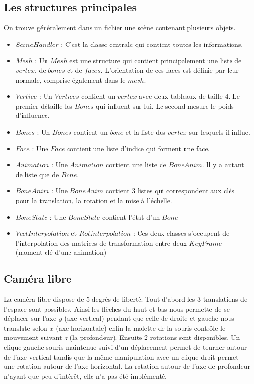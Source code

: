 \documentclass[a4paper]{report}
\begin{document}
\subsection{Les structures principales}
\par
On trouve généralement dans un fichier une scène contenant plusieurs objets.

\begin{itemize}
\item $SceneHandler$ : C'est la classe centrale qui contient toutes les informations.
\item $Mesh$ : Un $Mesh$ est une structure qui contient principalement une liste de $vertex$, de $bones$ et de $faces$. L'orientation de ces faces est définie par leur normale, comprise également dans le $mesh$.
\item $Vertice$ : Un $Vertices$ contient un $vertex$ avec deux tableaux de taille 4. Le premier détaille les $Bones$ qui influent sur lui. Le second mesure le poids d'influence.
\item $Bones$ : Un $Bones$ contient un $bone$ et la liste des $vertex$ sur lesquels il influe.
\item $Face$ : Une $Face$ contient une liste d'indice qui forment une face.
\item $Animation$ : Une $Animation$ contient une liste de $BoneAnim$. Il y a autant de liste que de $Bone$.
\item $BoneAnim$ : Une $BoneAnim$ contient 3 listes qui correspondent aux clés pour la translation, la rotation et la mise à l'échelle.
\item $BoneState$ : Une $BoneState$ contient l'état d'un $Bone$
\item $VectInterpolation$ et $RotInterpolation$ : Ces deux classes s'occupent de l'interpolation des matrices de transformation entre deux $KeyFrame$ (moment clé d'une animation)
\end{itemize}

\subsection{Caméra libre}
\par
La caméra libre dispose de 5 degrès de liberté. Tout d'abord les 3 translations de l'espace sont possibles. Ainsi les flèches du haut et bas nous permette de se déplacer sur l'axe $y$ (axe vertical) pendant que celle de droite et gauche nous translate selon $x$ (axe horizontale) enfin la molette de la souris contrôle le mouvement suivant $z$ (la profondeur). Ensuite 2 rotations sont disponibles. Un clique gauche souris maintenue suivi d'un déplacement permet de tourner autour de l'axe vertical tandis que la même manipulation avec un clique droit permet une rotation autour de l'axe horizontal. La rotation autour de l'axe de profondeur n'ayant que peu d'intérêt, elle n'a pas été implémenté. 
\end{document}
